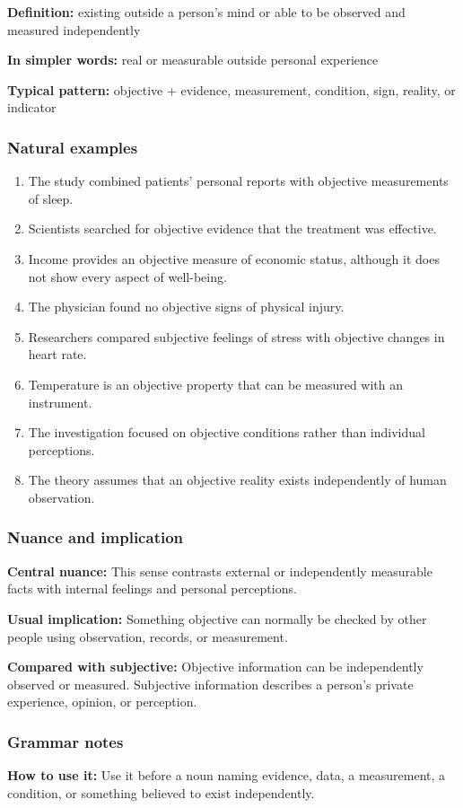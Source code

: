 \documentclass[11pt]{article}
\begin{document}
\textbf{Definition:} existing outside a person's mind or able to be observed and measured independently

\textbf{In simpler words:} real or measurable outside personal experience

\textbf{Typical pattern:} objective + evidence, measurement, condition, sign, reality, or indicator

\subsubsection{Natural examples}
\begin{enumerate}
  \item The study combined patients' personal reports with objective measurements of sleep.
  \item Scientists searched for objective evidence that the treatment was effective.
  \item Income provides an objective measure of economic status, although it does not show every aspect of well-being.
  \item The physician found no objective signs of physical injury.
  \item Researchers compared subjective feelings of stress with objective changes in heart rate.
  \item Temperature is an objective property that can be measured with an instrument.
  \item The investigation focused on objective conditions rather than individual perceptions.
  \item The theory assumes that an objective reality exists independently of human observation.
\end{enumerate}

\subsubsection{Nuance and implication}
\textbf{Central nuance:} This sense contrasts external or independently measurable facts with internal feelings and personal perceptions.

\textbf{Usual implication:} Something objective can normally be checked by other people using observation, records, or measurement.

\textbf{Compared with subjective:} Objective information can be independently observed or measured. Subjective information describes a person's private experience, opinion, or perception.

\subsubsection{Grammar notes}
\textbf{How to use it:} Use it before a noun naming evidence, data, a measurement, a condition, or something believed to exist independently.
\end{document}
